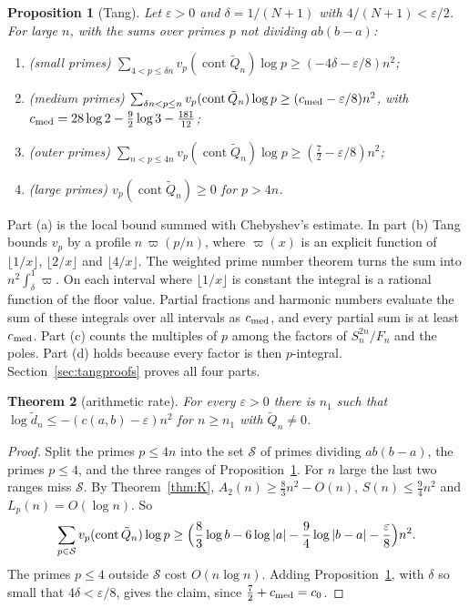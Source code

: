 \documentclass[11pt]{amsart}
\newtheorem{theorem}{Theorem}[section]
\newtheorem{proposition}[theorem]{Proposition}
\theoremstyle{definition}
\theoremstyle{remark}
\numberwithin{equation}{section}
\newcommand{\cont}{\operatorname{cont}}
\begin{document}
\begin{proposition}[Tang]\label{prop:tang}
Let $\varepsilon>0$ and $\delta=1/(N+1)$ with $4/(N+1)<\varepsilon/2$. For large $n$, with the sums over primes $p$ not
dividing $ab(b-a)$:
\begin{enumerate}[label=(\alph*)]
\item (small primes) $\sum_{4<p\le\delta n}v_p(\cont\tilde Q_n)\log p\ge(-4\delta-\varepsilon/8)n^2$;
\item (medium primes) $\sum_{\delta n<p\le n}v_p(\cont\tilde Q_n)\log p\ge(c_{\rm med}-\varepsilon/8)n^2$, with
 $c_{\rm med}=28\log2-\frac92\log3-\frac{181}{12}$;
\item (outer primes) $\sum_{n<p\le4n}v_p(\cont\tilde Q_n)\log p\ge(\frac72-\varepsilon/8)n^2$;
\item (large primes) $v_p(\cont\tilde Q_n)\ge0$ for $p>4n$.
\end{enumerate}
\end{proposition}

Part (a) is the local bound summed with Chebyshev's estimate. In part (b) Tang bounds $v_p$ by a profile
$n\,\varpi(p/n)$, where $\varpi(x)$ is an explicit function of $\lfloor1/x\rfloor$, $\lfloor2/x\rfloor$ and
$\lfloor4/x\rfloor$. The weighted prime number theorem turns the sum into $n^2\int_\delta^1\varpi$. On each interval
where $\lfloor1/x\rfloor$ is constant the integral is a rational function of the floor value. Partial fractions and
harmonic numbers evaluate the sum of these integrals over all intervals as $c_{\rm med}$, and every partial sum is at
least $c_{\rm med}$. Part (c) counts the multiples of $p$ among the factors of $S_n^{2n}/F_n$ and the poles. Part (d)
holds because every factor is then $p$-integral. Section~\ref{sec:tangproofs} proves all four parts.

\begin{theorem}[arithmetic rate]\label{thm:content}
For every $\varepsilon>0$ there is $n_1$ such that $\log\tilde d_n\le-(c(a,b)-\varepsilon)n^2$ for $n\ge n_1$ with
$\tilde Q_n\ne0$.
\end{theorem}

\begin{proof}
Split the primes $p\le4n$ into the set $\mathcal S$ of primes dividing $ab(b-a)$, the primes $p\le4$, and the three
ranges of Proposition~\ref{prop:tang}. For $n$ large the last two ranges miss $\mathcal S$. By
Theorem~\ref{thm:K}, $A_2(n)\ge\frac83n^2-O(n)$, $S(n)\le\frac94n^2$ and $L_p(n)=O(\log n)$. So
\[
 \sum_{p\in\mathcal S}v_p(\cont\tilde Q_n)\log p\ge\Bigl(\frac83\log b-6\log|a|-\frac94\log|b-a|-\frac\varepsilon8\Bigr)n^2 .
\]
The primes $p\le4$ outside $\mathcal S$ cost $O(n\log n)$. Adding Proposition~\ref{prop:tang}, with $\delta$ so small
that $4\delta<\varepsilon/8$, gives the claim, since $\frac72+c_{\rm med}=c_0$.
\end{proof}
\end{document}
